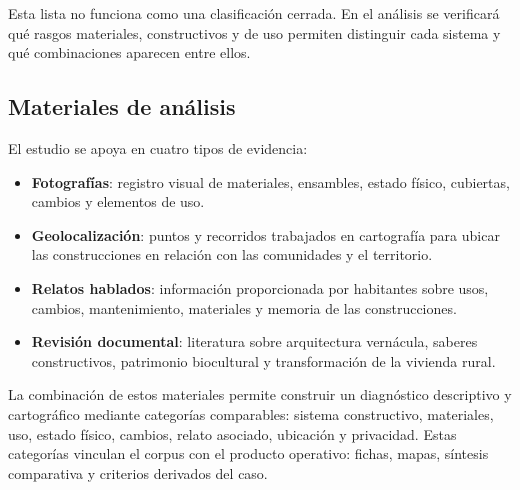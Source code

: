 Esta lista no funciona como una clasificación cerrada. En el análisis se verificará qué rasgos materiales, constructivos y de uso permiten distinguir cada sistema y qué combinaciones aparecen entre ellos.

\subsection{Materiales de análisis}

El estudio se apoya en cuatro tipos de evidencia:

\begin{itemize}
	\item \textbf{Fotografías}: registro visual de materiales, ensambles, estado físico, cubiertas, cambios y elementos de uso.
	\item \textbf{Geolocalización}: puntos y recorridos trabajados en cartografía para ubicar las construcciones en relación con las comunidades y el territorio.
	\item \textbf{Relatos hablados}: información proporcionada por habitantes sobre usos, cambios, mantenimiento, materiales y memoria de las construcciones.
	\item \textbf{Revisión documental}: literatura sobre arquitectura vernácula, saberes constructivos, patrimonio biocultural y transformación de la vivienda rural.
\end{itemize}

La combinación de estos materiales permite construir un diagnóstico descriptivo y cartográfico mediante categorías comparables: sistema constructivo, materiales, uso, estado físico, cambios, relato asociado, ubicación y privacidad. Estas categorías vinculan el corpus con el producto operativo: fichas, mapas, síntesis comparativa y criterios derivados del caso.

